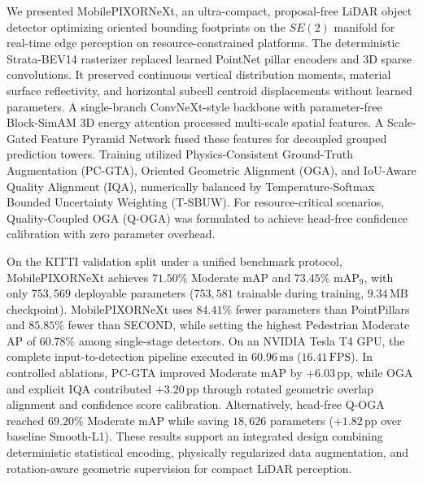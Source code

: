 
We presented MobilePIXORNeXt, an ultra-compact, proposal-free LiDAR object detector optimizing oriented bounding footprints on the $SE(2)$ manifold for real-time edge perception on resource-constrained platforms. The deterministic Strata-BEV14 rasterizer replaced learned PointNet pillar encoders and 3D sparse convolutions. It preserved continuous vertical distribution moments, material surface reflectivity, and horizontal subcell centroid displacements without learned parameters. A single-branch ConvNeXt-style backbone with parameter-free Block-SimAM 3D energy attention processed multi-scale spatial features. A Scale-Gated Feature Pyramid Network fused these features for decoupled grouped prediction towers. Training utilized Physics-Consistent Ground-Truth Augmentation (PC-GTA), Oriented Geometric Alignment (OGA), and IoU-Aware Quality Alignment (IQA), numerically balanced by Temperature-Softmax Bounded Uncertainty Weighting (T-SBUW). For resource-critical scenarios, Quality-Coupled OGA (Q-OGA) was formulated to achieve head-free confidence calibration with zero parameter overhead.

On the KITTI validation split under a unified benchmark protocol, MobilePIXORNeXt achieves $71.50\%$ Moderate mAP and $73.45\%$ $\text{mAP}_9$, with only $753{,}569$ deployable parameters ($753{,}581$ trainable during training, $9.34\,\text{MB}$ checkpoint). MobilePIXORNeXt uses $84.41\%$ fewer parameters than PointPillars and $85.85\%$ fewer than SECOND, while setting the highest Pedestrian Moderate AP of $60.78\%$ among single-stage detectors. On an NVIDIA Tesla T4 GPU, the complete input-to-detection pipeline executed in $60.96\,\text{ms}$ ($16.41\,\text{FPS}$). In controlled ablations, PC-GTA improved Moderate mAP by $+6.03\,\text{pp}$, while OGA and explicit IQA contributed $+3.20\,\text{pp}$ through rotated geometric overlap alignment and confidence score calibration. Alternatively, head-free Q-OGA reached $69.20\%$ Moderate mAP while saving $18{,}626$ parameters ($+1.82\,\text{pp}$ over baseline Smooth-L1). These results support an integrated design combining deterministic statistical encoding, physically regularized data augmentation, and rotation-aware geometric supervision for compact LiDAR perception.

